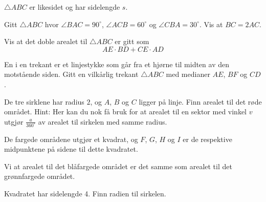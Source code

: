 $ \triangle ABC $ er likesidet og har sidelengde $ s $. 


Gitt $ \triangle ABC $ hvor $ \angle BAC=90^\circ $, $ \angle ACB=60^\circ $ og $ \angle CBA=30^\circ $. Vis at $ BC=2AC $.

Vis at det doble arealet til $ \triangle ABC $ er gitt som
\[ AE\cdot BD + CE\cdot AD \]

\newpage
{}
En  i en trekant er et linjestykke som går fra et hjørne til midten av den motstående siden. 
Gitt en vilkårlig trekant $ \triangle ABC $ med medianer $ AE $, $ BF $ og  $ CD $. 

De tre sirklene har radius $ 2 $, og $ A $, $ B $ og $ C $ ligger på linje.
Finn arealet til det røde området.
{\footnotesize Hint: Her kan du nok få bruk for at arealet til en sektor med vinkel $ v $ utgjør $ \frac{a}{360^\circ} $ av arealet til sirkelen med samme radius.}

\newpage


De fargede områdene utgjør et kvadrat, og $ F $, $ G $, $ H $ og $ I $ er de respektive midpunktene på sidene til dette kvadratet.\os

Vi at arealet til det blåfargede området er det samme som arealet til det grønnfargede området.

Kvadratet har sidelengde 4. Finn radien til sirkelen.

